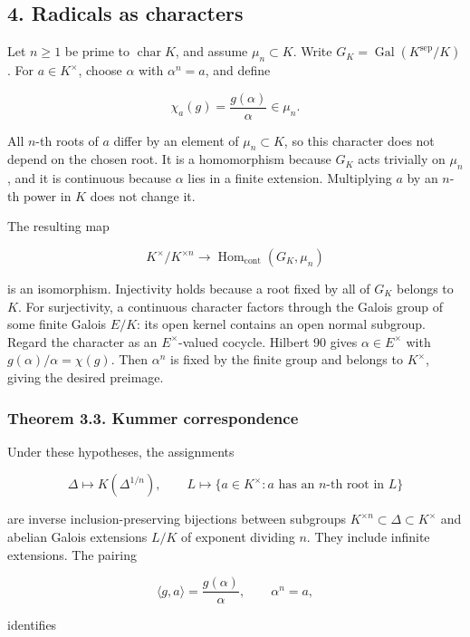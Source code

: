 \documentclass[11pt,a4paper]{article}
\begin{document}
\subsection{4. Radicals as characters}\label{radicals-as-characters}

Let \(n\geq1\) be prime to \(\operatorname{char}K\), and assume
\(\mu_n\subset K\). Write
\(G_K=\operatorname{Gal}(K^{\mathrm{sep}}/K)\). For \(a\in K^\times\),
choose \(\alpha\) with \(\alpha^n=a\), and define

\[
\chi_a(g)=\frac{g(\alpha)}{\alpha}\in\mu_n.
\]

All \(n\)-th roots of \(a\) differ by an element of \(\mu_n\subset K\),
so this character does not depend on the chosen root. It is a
homomorphism because \(G_K\) acts trivially on \(\mu_n\), and it is
continuous because \(\alpha\) lies in a finite extension. Multiplying
\(a\) by an \(n\)-th power in \(K\) does not change it.

The resulting map

\[
K^\times/K^{\times n}\longrightarrow
\operatorname{Hom}_{\mathrm{cont}}(G_K,\mu_n)
\]

is an isomorphism. Injectivity holds because a root fixed by all of
\(G_K\) belongs to \(K\). For surjectivity, a continuous character
factors through the Galois group of some finite Galois \(E/K\): its open
kernel contains an open normal subgroup. Regard the character as an
\(E^\times\)-valued cocycle. Hilbert 90 gives \(\alpha\in E^\times\)
with \(g(\alpha)/\alpha=\chi(g)\). Then \(\alpha^n\) is fixed by the
finite group and belongs to \(K^\times\), giving the desired preimage.

\subsubsection{Theorem 3.3. Kummer
correspondence}\label{theorem-3.3.-kummer-correspondence}

Under these hypotheses, the assignments

\[
\Delta\longmapsto K(\Delta^{1/n}),
\qquad
L\longmapsto\{a\in K^\times:a\text{ has an }n\text{-th root in }L\}
\]

are inverse inclusion-preserving bijections between subgroups
\(K^{\times n}\subset\Delta\subset K^\times\) and abelian Galois
extensions \(L/K\) of exponent dividing \(n\). They include infinite
extensions. The pairing

\[
\langle g,a\rangle=\frac{g(\alpha)}\alpha,
\qquad \alpha^n=a,
\]

identifies
\end{document}

